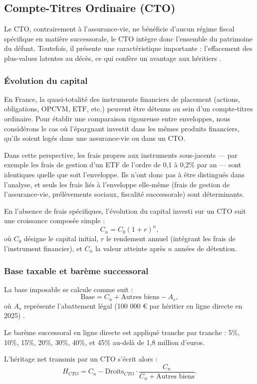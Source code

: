 \subsection{Compte-Titres Ordinaire (CTO)}
\label{sec:cto}

Le CTO, contrairement à l'assurance-vie, ne bénéficie d'aucun régime fiscal spécifique en matière successorale, le CTO intègre donc l'ensemble du patrimoine du défunt. Toutefois, il présente une caractéristique importante : l'effacement des plus-values latentes au décès, ce qui confère un avantage aux héritiers \cite{lechiquier_2019}.

\subsubsection{Évolution du capital}
\label{sec:cto_evolution_capital}

En France, la quasi-totalité des instruments financiers de placement (actions, obligations, OPCVM, ETF, etc.) peuvent être détenus au sein d'un compte-titres ordinaire. Pour établir une comparaison rigoureuse entre enveloppes, nous considérons le cas où l'épargnant investit dans les mêmes produits financiers, qu'ils soient logés dans une assurance-vie ou dans un CTO.

Dans cette perspective, les frais propres aux instruments sous-jacents — par exemple les frais de gestion d'un ETF de l'ordre de 0,1 à 0,2\% par an — sont identiques quelle que soit l'enveloppe. Ils n'ont donc pas à être distingués dans l'analyse, et seuls les frais liés à l'enveloppe elle-même (frais de gestion de l'assurance-vie, prélèvements sociaux, fiscalité successorale) sont déterminants.

En l'absence de frais spécifiques, l'évolution du capital investi sur un CTO suit une croissance composée simple :
\begin{equation}
    C_n = C_0(1+r)^n,
\end{equation}
où \(C_0\) désigne le capital initial, \(r\) le rendement annuel (intégrant les frais de l'instrument financier), et \(C_n\) la valeur atteinte après \(n\) années de détention.

\subsubsection{Base taxable et barème successoral}
\label{sec:cto_base_taxable}

La base imposable se calcule comme suit :
\begin{equation}
    \text{Base} = C_n + \text{Autres biens} - A_s,
\end{equation}
où \(A_s\) représente l'abattement légal (100 000 € par héritier en ligne directe en 2025) \cite{cgi_990i, cgi_757b}.

Le barème successoral en ligne directe est appliqué tranche par tranche \cite{bofip_droits_mutation_general}: 5\%, 10\%, 15\%, 20\%, 30\%, 40\%, et 45\% au-delà de 1,8 million d'euros.

L'héritage net transmis par un CTO s'écrit alors :
\begin{equation}
    H_{CTO} = C_n - \text{Droits}_{CTO} \cdot \frac{C_n}{C_n + \text{Autres biens}}.
\end{equation}
